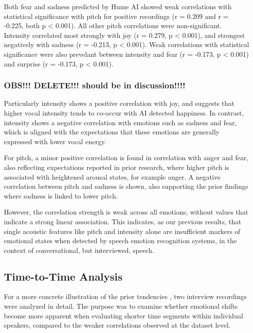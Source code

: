 Both fear and sadness predicted by Hume AI showed weak correlations with statistical significance with pitch for positive recordings (r = 0.209 and r = -0.225, both p < 0.001). All other pitch correlations were non-significant. 
Intensity correlated most strongly with joy (r = 0.279, p < 0.001), and strongest negatively with sadness (r = -0.213, p < 0.001). Weak correlations with statistical significance were also prevelant between intensity and fear (r = -0.173, p < 0.001) and surprise (r = -0.173, p < 0.001).


\subsubsection{OBS!!! DELETE!!! should be in discussion!!!! }


Particularly intensity shows a positive correlation with joy, and suggests that higher vocal intensity tends to co-occur with AI detected happiness. In contrast, intensity shows a negative correlation with emotions such as sadness and fear, which is aligned with the expectations that these emotions are generally expressed with lower vocal energy. 

For pitch, a minor positive correlation is found in correlation with anger and fear, also reflecting expectations reported in prior research, where higher pitch is associated with heightened arousal states, for example anger. A negative correlation between pitch and sadness is shown, also supporting the prior findings where sadness is linked to lower pitch. 

However, the correlation strength is weak across all emotions, without values that indicate a strong linear association. This indicates, as our previous results, that single acoustic features like pitch and intensity alone are insufficient markers of emotional states when detected by speech emotion recognition systems, in the context of conversational, but interviewed, speech. 

\subsection{Time-to-Time Analysis}

For a more concrete illustration of the prior tendencies , two interview recordings were analyzed in detail. The purpose was to examine whether emotional shifts become more apparent when evaluating shorter time segments within individual speakers, compared to the weaker correlations observed at the dataset level.

